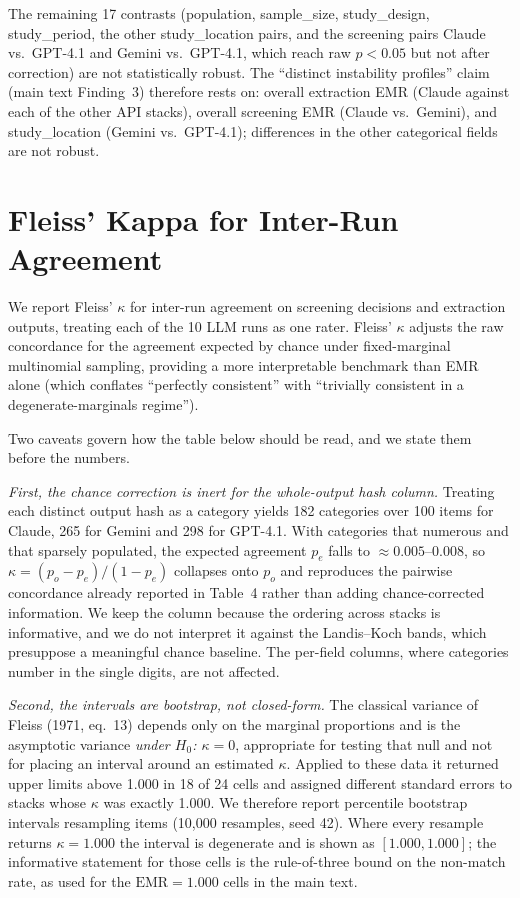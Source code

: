 \documentclass[11pt]{article}
\begin{document}
\noindent The remaining 17 contrasts (population, sample\_size, study\_design, study\_period, the other study\_location pairs, and the screening pairs Claude vs.\ GPT-4.1 and Gemini vs.\ GPT-4.1, which reach raw $p{<}0.05$ but not after correction) are not statistically robust. The ``distinct instability profiles'' claim (main text Finding~3) therefore rests on: overall extraction EMR (Claude against each of the other API stacks), overall screening EMR (Claude vs.\ Gemini), and study\_location (Gemini vs.\ GPT-4.1); differences in the other categorical fields are not robust.

\section{Fleiss' Kappa for Inter-Run Agreement}
\label{sec:fleiss_supp}

We report Fleiss' $\kappa$ for inter-run agreement on screening decisions and extraction outputs, treating each of the 10 LLM runs as one rater. Fleiss' $\kappa$ adjusts the raw concordance for the agreement expected by chance under fixed-marginal multinomial sampling, providing a more interpretable benchmark than EMR alone (which conflates ``perfectly consistent'' with ``trivially consistent in a degenerate-marginals regime'').

Two caveats govern how the table below should be read, and we state them before the numbers.

\emph{First, the chance correction is inert for the whole-output hash column.} Treating each distinct output hash as a category yields 182 categories over 100 items for Claude, 265 for Gemini and 298 for GPT-4.1. With categories that numerous and that sparsely populated, the expected agreement $p_e$ falls to ${\approx}0.005$--$0.008$, so $\kappa{=}(p_o{-}p_e)/(1{-}p_e)$ collapses onto $p_o$ and reproduces the pairwise concordance already reported in Table~4 rather than adding chance-corrected information. We keep the column because the ordering across stacks is informative, and we do not interpret it against the Landis--Koch bands, which presuppose a meaningful chance baseline. The per-field columns, where categories number in the single digits, are not affected.

\emph{Second, the intervals are bootstrap, not closed-form.} The classical variance of Fleiss (1971, eq.~13) depends only on the marginal proportions and is the asymptotic variance \emph{under $H_0$: $\kappa{=}0$}, appropriate for testing that null and not for placing an interval around an estimated $\kappa$. Applied to these data it returned upper limits above 1.000 in 18 of 24 cells and assigned different standard errors to stacks whose $\kappa$ was exactly 1.000. We therefore report percentile bootstrap intervals resampling items (10,000 resamples, seed 42). Where every resample returns $\kappa{=}1.000$ the interval is degenerate and is shown as $[1.000, 1.000]$; the informative statement for those cells is the rule-of-three bound on the non-match rate, as used for the $\textrm{EMR}{=}1.000$ cells in the main text.
\end{document}
